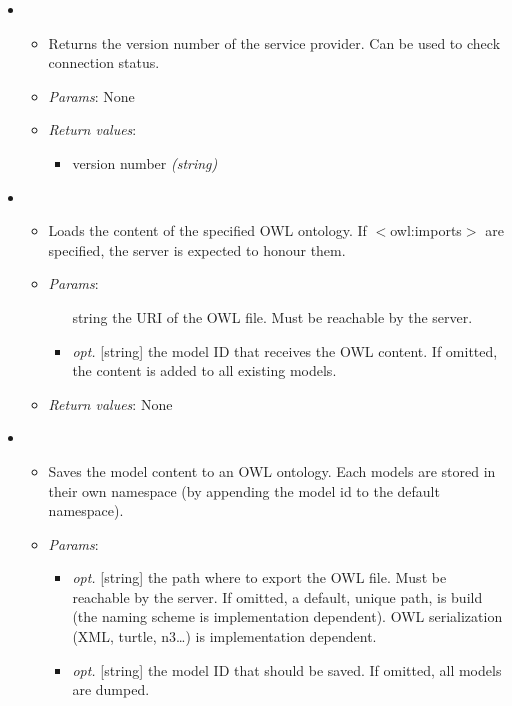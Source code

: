 \begin{itemize}

\item  {}
    \begin{itemize}
    \item  Returns the version number of the service provider. Can be used to
    check connection status.
    \item  \emph{Params}: None
    \item  \emph{Return values}:
        \begin{itemize}
        \item  version number \emph{(string)}
        \end{itemize}
    \end{itemize}

\item  {}
    \begin{itemize}
    \item  Loads the content of the specified OWL ontology. If
    $<$owl:imports$>$ are specified, the server is expected to honour them.
    \item  \emph{Params}:
        \begin{itemize}
        \item  [string] the URI of the OWL file. Must be reachable by the
        server.
        \item  \emph{opt.} [string] the model ID that receives the OWL content.
        If omitted, the content is added to all existing models. 
        \end{itemize}

    \item  \emph{Return values}: None
    \end{itemize}

\item  {}
\begin{itemize}
\item  Saves the model content to an OWL ontology. Each models are stored in their own namespace (by appending the model id to the default namespace).
\item  \emph{Params}:
\begin{itemize}
\item  \emph{opt.} [string] the path where to export the OWL file. Must be reachable by the server. If omitted, a default, unique path, is build (the naming scheme is implementation dependent). OWL serialization (XML, turtle, n3\ldots{}) is implementation dependent.
\item  \emph{opt.} [string] the model ID that should be saved. If omitted, all models are dumped.
\end{itemize}


\end{itemize}
\end{itemize}
